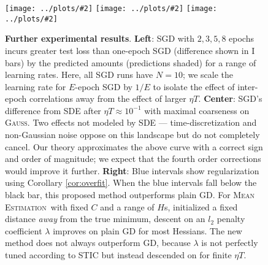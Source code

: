 \documentclass[anon,12pt]{colt2021} %
\newcommand{\pmoo}[2]{\texttt{[image: ../plots/\#2]}}
\newcommand{\Gauss}{\textsc{Gauss}}
\newcommand{\MeanEstimation}{\textsc{Mean Estimation}}
\begin{document}
        \begin{figure}[h] 
            \centering
            \centering
            \pmoo{3.5cm}{multi-fashion-logistic-0}
            \pmoo{3.5cm}{vs-sde}
            \pmoo{3.5cm}{tak-reg}
            \caption{
                \textbf{Further experimental results}.
                \textbf{Left}: SGD with $2, 3, 5, 8$ epochs incurs greater test
                loss than one-epoch SGD (difference shown in I bars) by the
                predicted amounts (predictions shaded) for a range of learning
                rates.  Here, all SGD runs have $N=10$; we scale the learning
                rate for $E$-epoch SGD by $1/E$ to isolate the effect of
                inter-epoch correlations away from the effect of larger $\eta
                T$.
                \textbf{Center}: SGD's difference from SDE after $\eta T
                \approx 10^{-1}$ with maximal coarseness on \Gauss.  Two
                effects not modeled by SDE --- time-discretization and
                non-Gaussian noise oppose on this landscape but do not
                completely cancel.  Our theory approximates the above curve
                with a correct sign and order of magnitude; we expect that the
                fourth order corrections would improve it further.
                \textbf{Right}: Blue intervals show regularization using Corollary
                \ref{cor:overfit}.  When the blue intervals fall below the
                black bar, this proposed method outperforms plain GD.  For
                \MeanEstimation\ with fixed $C$ and a range of $H$s, initialized
                a fixed distance \emph{away} from the true minimum, descent on
                an $l_2$ penalty coefficient $\lambda$ improves on plain GD for
                most Hessians.  The new method does not always outperform GD,
                because $\lambda$ is not perfectly tuned according to STIC but
                instead descended on for finite $\eta T$.
            }
            \label{fig:takreg}
        \end{figure}
\end{document}
